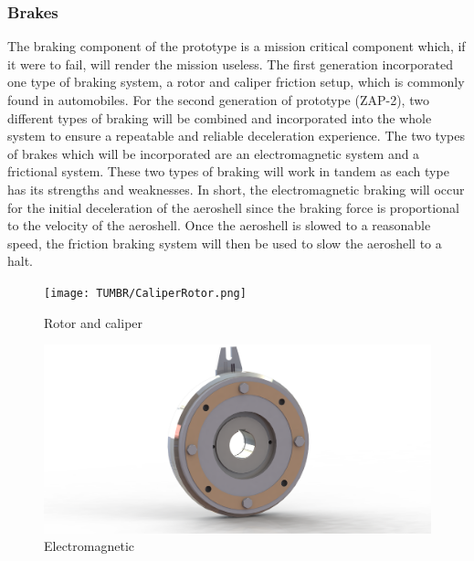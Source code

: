 \subsubsection{Brakes}

\indent\indent The braking component of the prototype is a mission critical component which, if it were to fail, will render the mission useless. The first generation incorporated one type of braking system, a rotor and caliper friction setup, which is commonly found in automobiles. For the second generation of prototype (ZAP-2), two different types of braking will be combined and incorporated into the whole system to ensure a repeatable and reliable deceleration experience. The two types of brakes which will be incorporated are an electromagnetic system and a frictional system. These two types of braking will work in tandem as each type has its strengths and weaknesses. In short, the electromagnetic braking will occur for the initial deceleration of the aeroshell since the braking force is proportional to the velocity of the aeroshell. Once the aeroshell is slowed to a reasonable speed, the friction braking system will then be used to slow the aeroshell to a halt.

\begin{figure}[!ht]
\centering
\begin{minipage}{.5\textwidth}
  \centering
  \texttt{[image: TUMBR/CaliperRotor.png]}
  \caption{\label{fig:DiscBrake}Rotor and caliper}
\end{minipage}%
\begin{minipage}{.5\textwidth}
  \centering
  \includegraphics[width=0.9\linewidth]{TUMBR/EM.png}
  \caption{\label{fig:Electro}Electromagnetic}
\end{minipage}
\end{figure}

